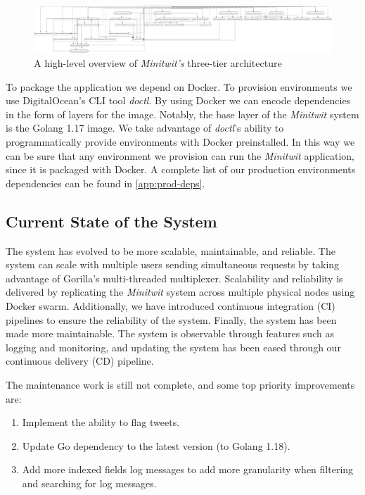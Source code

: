 \begin{figure}[H]
    \centering
    \includegraphics[width=\textwidth]{images/depth-1-deps.jpg}
    \caption{A high-level overview of \textit{Minitwit's} three-tier architecture}
    \label{deps:fig:depth1}
\end{figure}

To package the application we depend on Docker. To provision environments we use DigitalOcean's CLI tool \textit{doctl}.
By using Docker we can encode dependencies in the form of layers for the image.
Notably, the base layer of the \textit{Minitwit} system is the Golang 1.17 image.
We take advantage of \textit{doctl}'s ability to programmatically provide environments with Docker preinstalled.
In this way we can be sure that any environment we provision can run the \textit{Minitwit} application, since it is packaged with Docker. 
A complete list of our production environments dependencies can be found in \autoref{app:prod-deps}.


\subsection{Current State of the System}
\label{sec:current_state}
The system has evolved to be more scalable, maintainable, and reliable.
The system can scale with multiple users sending simultaneous requests by taking advantage of Gorilla's multi-threaded multiplexer.
Scalability and reliability is delivered by replicating the \textit{Minitwit} system across multiple physical nodes using Docker swarm.
Additionally, we have introduced continuous integration (CI) pipelines to ensure the reliability of the system.
Finally, the system has been made more maintainable.
The system is observable through features such as logging and monitoring, and updating the system has been eased through our continuous delivery (CD) pipeline.

The maintenance work is still not complete, and some top priority improvements are:
\begin{enumerate}
    \item Implement the ability to flag tweets.
    \item Update Go dependency to the latest version (to Golang 1.18).
    \item Add more indexed fields log messages to add more granularity when filtering and searching for log messages.
\end{enumerate}

